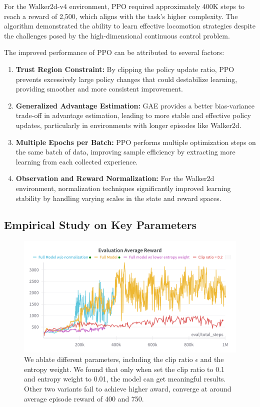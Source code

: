 \documentclass[a4paper,twocolumn]{article}
\begin{document}
For the Walker2d-v4 environment, PPO required approximately 400K steps to reach a reward of 2,500, which aligns with the task's higher complexity. The algorithm demonstrated the ability to learn effective locomotion strategies despite the challenges posed by the high-dimensional continuous control problem.

The improved performance of PPO can be attributed to several factors:

\begin{enumerate}
    \item \textbf{Trust Region Constraint:} By clipping the policy update ratio, PPO prevents excessively large policy changes that could destabilize learning, providing smoother and more consistent improvement.
    
    \item \textbf{Generalized Advantage Estimation:} GAE provides a better bias-variance trade-off in advantage estimation, leading to more stable and effective policy updates, particularly in environments with longer episodes like Walker2d.
    
    \item \textbf{Multiple Epochs per Batch:} PPO performs multiple optimization steps on the same batch of data, improving sample efficiency by extracting more learning from each collected experience.
    
    \item \textbf{Observation and Reward Normalization:} For the Walker2d environment, normalization techniques significantly improved learning stability by handling varying scales in the state and reward spaces.
\end{enumerate}

\subsection{Empirical Study on Key Parameters}

\begin{figure}[H]
\centering
\includegraphics[width=0.95\linewidth]{figures/walker_eval_reward}
\caption{We ablate different parameters, including the clip ratio $\epsilon$ and the entropy weight. We found that only when set the clip ratio to 0.1 and entropy weight to 0.01, the model can get meaningful results. Other two variants fail to achieve higher award, converge at around average episode reward of 400 and 750.}
\label{fig:walkerevalreward}
\end{figure}
\end{document}
